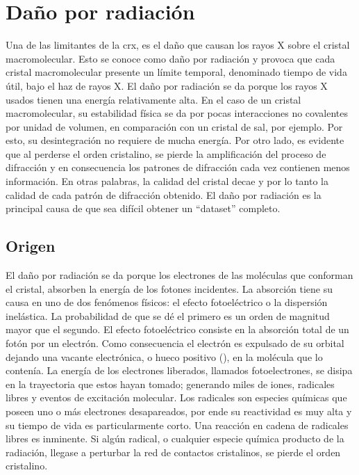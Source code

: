 \section{Daño por radiación}
Una de las limitantes de la \acrshort{crx}, es el daño que causan los rayos X sobre el cristal macromolecular. Esto se conoce como daño por radiación y provoca que cada cristal macromolecular presente un límite temporal, denominado tiempo de vida útil, bajo el haz de rayos X. El daño por radiación se da porque los rayos X usados tienen una energía relativamente alta. En el caso de un cristal macromolecular, su estabilidad física se da por pocas interacciones no covalentes por unidad de volumen, en comparación con un cristal de sal, por ejemplo. Por esto, su desintegración no requiere de mucha energía. Por otro lado, es evidente que al perderse el orden cristalino, se pierde la amplificación del proceso de difracción y en consecuencia los patrones de difracción cada vez contienen menos información. En otras palabras, la calidad del cristal decae y por lo tanto la calidad de cada patrón de difracción obtenido. El daño por radiación es la principal causa de que sea difícil obtener un \enquote{dataset} completo. 

\subsection{Origen}
El daño por radiación se da porque los electrones de las moléculas que conforman el cristal, absorben la energía de los fotones incidentes. La absorción tiene su causa en uno de dos fenómenos físicos: el efecto fotoeléctrico o la dispersión inelástica. La probabilidad de que se dé el primero es un orden de magnitud mayor que el segundo. El efecto fotoeléctrico consiste en la absorción total de un fotón por un electrón. Como consecuencia el electrón es expulsado de su orbital dejando una vacante electrónica, o hueco positivo (), en la molécula que lo contenía. La energía de los electrones liberados, llamados fotoelectrones, se disipa en la trayectoria que estos hayan tomado; generando miles de iones, radicales libres y eventos de excitación molecular. Los radicales son especies químicas que poseen uno o más electrones desapareados, por ende su reactividad es muy alta y su tiempo de vida es particularmente corto. Una reacción en cadena de radicales libres es inminente. Si algún radical, o cualquier especie química producto de la radiación, llegase a perturbar la red de contactos cristalinos, se pierde el orden cristalino. 

